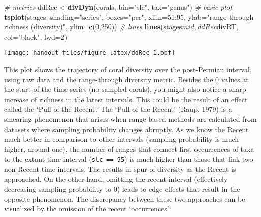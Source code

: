 \documentclass[]{article}
\newenvironment{Shaded}{\begin{snugshade}}{\end{snugshade}}
\newcommand{\KeywordTok}[1]{\textcolor[rgb]{0.13,0.29,0.53}{\textbf{{#1}}}}
\newcommand{\DataTypeTok}[1]{\textcolor[rgb]{0.13,0.29,0.53}{{#1}}}
\newcommand{\DecValTok}[1]{\textcolor[rgb]{0.00,0.00,0.81}{{#1}}}
\newcommand{\StringTok}[1]{\textcolor[rgb]{0.31,0.60,0.02}{{#1}}}
\newcommand{\CommentTok}[1]{\textcolor[rgb]{0.56,0.35,0.01}{\textit{{#1}}}}
\newcommand{\NormalTok}[1]{{#1}}
\begin{document}
\begin{Shaded}
\begin{Highlighting}[]
\CommentTok{# metrics}
\NormalTok{ddRec <-}\KeywordTok{divDyn}\NormalTok{(corals, }\DataTypeTok{bin=}\StringTok{"slc"}\NormalTok{, }\DataTypeTok{tax=}\StringTok{"genus"}\NormalTok{)}
\CommentTok{# basic plot}
  \KeywordTok{tsplot}\NormalTok{(stages, }\DataTypeTok{shading=}\StringTok{"series"}\NormalTok{, }\DataTypeTok{boxes=}\StringTok{"per"}\NormalTok{, }\DataTypeTok{xlim=}\DecValTok{51}\NormalTok{:}\DecValTok{95}\NormalTok{,}
    \DataTypeTok{ylab=}\StringTok{"range-through richness (diversity)"}\NormalTok{, }\DataTypeTok{ylim=}\KeywordTok{c}\NormalTok{(}\DecValTok{0}\NormalTok{,}\DecValTok{250}\NormalTok{))}
\CommentTok{# lines}
  \KeywordTok{lines}\NormalTok{(stages$mid, ddRec$divRT, }\DataTypeTok{col=}\StringTok{"black"}\NormalTok{, }\DataTypeTok{lwd=}\DecValTok{2}\NormalTok{)}
\end{Highlighting}
\end{Shaded}

\texttt{[image: handout\_files/figure-latex/ddRec-1.pdf]}

This plot shows the trajectory of coral diversity over the post-Permian
interval, using raw data and the range-through diversity metric. Besides
the 0 values at the start of the time series (no sampled corals), you
might also notice a sharp increase of richness in the latest intervals.
This could be the result of an effect called the `Pull of the Recent'.
The `Pull of the Recent' (Raup, 1979) is a smearing phenomenon that
arises when range-based methods are calculated from datasets where
sampling probability changes abruptly. As we know the Recent much better
in comparison to other intervals (sampling probability is much higher,
around one), the number of ranges that connect first occurrences of taxa
to the extant time interval (\texttt{slc\ ==\ 95}) is much higher than
those that link two non-Recent time intervals. The results in spur of
diversity as the Recent is approached. On the other hand, omitting the
recent interval (effectively decreasing sampling probability to 0) leads
to edge effects that result in the opposite phenomenon. The discrepancy
between these two approaches can be visualized by the omission of the
recent `occurrences':
\end{document}
